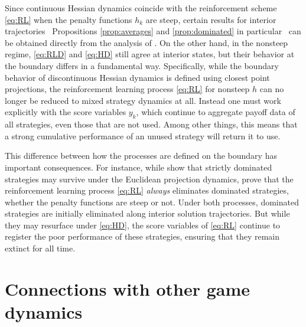 \documentclass[reqno]{amsart}
\theoremstyle{plain}
\theoremstyle{definition}
\theoremstyle{remark}
\numberwithin{equation}{section}
\numberwithin{theorem}{section}
\begin{document}
Since continuous Hessian dynamics coincide with the reinforcement scheme \eqref{eq:RL} when the penalty functions $h_{k}$ are steep, certain results for interior trajectories \textendash\ Propositions \ref{prop:averages} and \ref{prop:dominated} in particular \textendash\ can be obtained directly from the analysis of \cite{MS16}.
On the other hand, in the nonsteep regime, \eqref{eq:RLD} and \eqref{eq:HD} still agree at interior states,
but their behavior at the boundary differs in a fundamental way.
Specifically, while  the boundary behavior of discontinuous Hessian dynamics is defined using closest point projections, the reinforcement learning process \eqref{eq:RL} for nonsteep $h$ can no longer be reduced to mixed strategy dynamics at all.
Instead one must work explicitly with the score variables $y_k$, which continue to aggregate payoff data of all strategies, even those that are not used.
Among other things, this means that a strong cumulative performance of an unused strategy will return it to use.  

This difference between how the processes are defined on the boundary has important consequences.
For instance, while \cite{SDL08} show that strictly dominated strategies may survive under the Euclidean projection dynamics, \cite{MS16} prove that the reinforcement learning process \eqref{eq:RL}  \emph{always} eliminates dominated strategies, whether the penalty functions are steep or not.
Under both processes, dominated strategies are initially eliminated along interior solution trajectories.
But while they may resurface under \eqref{eq:HD}, the score variables of \eqref{eq:RL} continue to register the poor performance of these strategies, ensuring that they remain extinct for all time.

\appendix

\section{Connections with other game dynamics}
\label{app:geometry}
\end{document}
